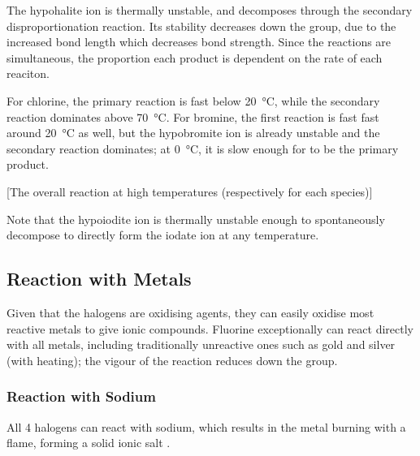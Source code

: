 
			The hypohalite ion is thermally unstable, and decomposes through the secondary disproportionation reaction. Its stability
			decreases down the group, due to the increased bond length which decreases bond strength. Since the reactions are simultaneous,
			the proportion each product is dependent on the rate of each reaciton.

			For chlorine, the primary reaction is fast below \SI{20}{\celsius}, while the secondary reaction dominates above \SI{70}{\celsius}.
			For bromine, the first reaction is fast fast around \SI{20}{\celsius} as well, but the hypobromite ion is already unstable and
			the secondary reaction dominates; at \SI{0}{\celsius}, it is slow enough for  to be the primary product.

			[The overall reaction at high temperatures (respectively for each species)]

			Note that the hypoiodite ion is thermally unstable enough to spontaneously decompose to directly form the iodate ion at any temperature.




		\subsection{Reaction with Metals}

			Given that the halogens are oxidising agents, they can easily oxidise most reactive metals to give ionic compounds. Fluorine
			exceptionally can react directly with all metals, including traditionally unreactive ones such as gold and silver (with heating);
			the vigour of the reaction reduces down the group.

			\subsubsection{Reaction with Sodium}

				All 4 halogens can react with sodium, which results in the metal burning with a  flame, forming a solid
				ionic salt .

